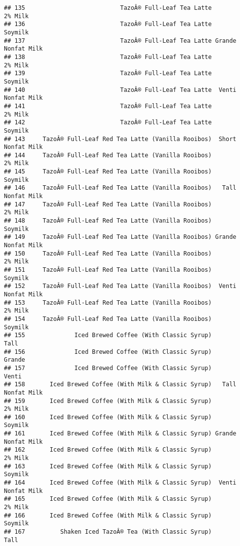 \documentclass[
]{article}
\begin{document}
\begin{verbatim}
## 135                           TazoÂ® Full-Leaf Tea Latte            2% Milk
## 136                           TazoÂ® Full-Leaf Tea Latte            Soymilk
## 137                           TazoÂ® Full-Leaf Tea Latte Grande Nonfat Milk
## 138                           TazoÂ® Full-Leaf Tea Latte            2% Milk
## 139                           TazoÂ® Full-Leaf Tea Latte            Soymilk
## 140                           TazoÂ® Full-Leaf Tea Latte  Venti Nonfat Milk
## 141                           TazoÂ® Full-Leaf Tea Latte            2% Milk
## 142                           TazoÂ® Full-Leaf Tea Latte            Soymilk
## 143     TazoÂ® Full-Leaf Red Tea Latte (Vanilla Rooibos)  Short Nonfat Milk
## 144     TazoÂ® Full-Leaf Red Tea Latte (Vanilla Rooibos)            2% Milk
## 145     TazoÂ® Full-Leaf Red Tea Latte (Vanilla Rooibos)            Soymilk
## 146     TazoÂ® Full-Leaf Red Tea Latte (Vanilla Rooibos)   Tall Nonfat Milk
## 147     TazoÂ® Full-Leaf Red Tea Latte (Vanilla Rooibos)            2% Milk
## 148     TazoÂ® Full-Leaf Red Tea Latte (Vanilla Rooibos)            Soymilk
## 149     TazoÂ® Full-Leaf Red Tea Latte (Vanilla Rooibos) Grande Nonfat Milk
## 150     TazoÂ® Full-Leaf Red Tea Latte (Vanilla Rooibos)            2% Milk
## 151     TazoÂ® Full-Leaf Red Tea Latte (Vanilla Rooibos)            Soymilk
## 152     TazoÂ® Full-Leaf Red Tea Latte (Vanilla Rooibos)  Venti Nonfat Milk
## 153     TazoÂ® Full-Leaf Red Tea Latte (Vanilla Rooibos)            2% Milk
## 154     TazoÂ® Full-Leaf Red Tea Latte (Vanilla Rooibos)            Soymilk
## 155              Iced Brewed Coffee (With Classic Syrup)               Tall
## 156              Iced Brewed Coffee (With Classic Syrup)             Grande
## 157              Iced Brewed Coffee (With Classic Syrup)              Venti
## 158       Iced Brewed Coffee (With Milk & Classic Syrup)   Tall Nonfat Milk
## 159       Iced Brewed Coffee (With Milk & Classic Syrup)            2% Milk
## 160       Iced Brewed Coffee (With Milk & Classic Syrup)            Soymilk
## 161       Iced Brewed Coffee (With Milk & Classic Syrup) Grande Nonfat Milk
## 162       Iced Brewed Coffee (With Milk & Classic Syrup)            2% Milk
## 163       Iced Brewed Coffee (With Milk & Classic Syrup)            Soymilk
## 164       Iced Brewed Coffee (With Milk & Classic Syrup)  Venti Nonfat Milk
## 165       Iced Brewed Coffee (With Milk & Classic Syrup)            2% Milk
## 166       Iced Brewed Coffee (With Milk & Classic Syrup)            Soymilk
## 167          Shaken Iced TazoÂ® Tea (With Classic Syrup)               Tall

\end{verbatim}
\end{document}
